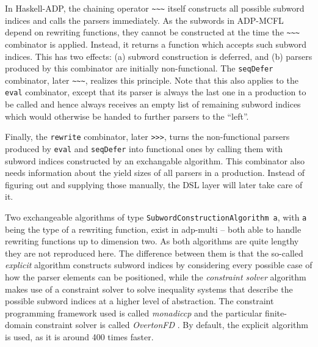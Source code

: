 \documentclass[
    a4paper,
    12pt,
    twoside,
    BCOR=12mm,
    parskip=half,
    chapterprefix,
    numbers=noenddot,
    bibliography=totoc
]{scrbook}
\begin{document}
In Haskell-ADP, the chaining operator \verb|~~~| itself constructs all possible subword indices and calls the parsers immediately. As the subwords in ADP-MCFL depend on rewriting functions, they cannot be constructed at the time the \verb|~~~| combinator is applied. Instead, it returns a function which accepts such subword indices. This has two effects: (a) subword construction is deferred, and (b) parsers produced by this combinator are initially non-functional. The \verb|seqDefer| combinator, later \verb|~~~|, realizes this principle. Note that this also applies to the \verb|eval| combinator, except that its parser is always the last one in a production to be called and hence always receives an empty list of remaining subword indices which would otherwise be handed to further parsers to the ``left''.

Finally, the \verb|rewrite| combinator, later \verb|>>>|, turns the non-functional parsers produced by \verb|eval| and \verb|seqDefer| into functional ones by calling them with subword indices constructed by an exchangable algorithm. This combinator also needs information about the yield sizes of all parsers in a production. Instead of figuring out and supplying those manually, the \gls{DSL} layer will later take care of it.

Two exchangeable algorithms of type \verb|SubwordConstructionAlgorithm a|, with \verb|a| being the type of a rewriting function, exist in adp-multi -- both able to handle rewriting functions up to dimension two. As both algorithms are quite lengthy they are not reproduced here. The difference between them is that the so-called \emph{explicit} algorithm constructs subword indices by considering every possible case of how the parser elements can be positioned, while the \emph{constraint solver} algorithm makes use of a constraint solver to solve inequality systems that describe the possible subword indices at a higher level of abstraction. The constraint programming framework used is called \emph{monadiccp} \citep{schrijvers_monadic_2009} and the particular finite-domain constraint solver is called \emph{OvertonFD} \citep{overton_constraint_2008}. By default, the explicit algorithm is used, as it is around 400 times faster.
\end{document}
